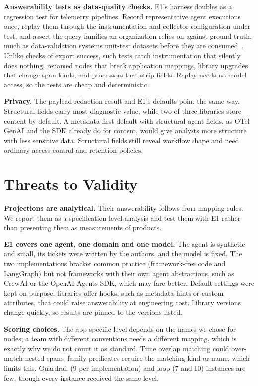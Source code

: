 \documentclass[conference]{IEEEtran}
\begin{document}
\textbf{Answerability tests as data-quality checks.} E1's harness doubles
as a regression test for telemetry pipelines. Record representative
agent executions once, replay them through the instrumentation and
collector configuration under test, and assert the query families an
organization relies on against ground truth, much as data-validation
systems unit-test datasets before they are consumed~\cite{deequ}. Unlike
checks of export success, such tests catch instrumentation that silently
does nothing, renamed nodes that break application mappings, library
upgrades that change span kinds, and processors that strip fields.
Replay needs no model access, so the tests are cheap and deterministic.

\textbf{Privacy.} The payload-redaction result and E1's defaults point
the same way. Structural fields carry most diagnostic value, while two
of three libraries store content by default. A metadata-first default
with structural agent fields, as OTel GenAI and the SDK already do for
content, would give analysts more structure with less sensitive data.
Structural fields still reveal workflow shape and need ordinary access
control and retention policies.

\section{Threats to Validity}
\label{sec:threats}

\textbf{Projections are analytical.} Their answerability follows from
mapping rules. We report them as a specification-level analysis and
test them with E1 rather than presenting them as measurements of
products.

\textbf{E1 covers one agent, one domain and one model.} The agent is
synthetic and small, its tickets were written by the authors, and the
model is fixed. The two implementations bracket common practice
(framework-free code and LangGraph) but not frameworks with their own
agent abstractions, such as CrewAI or the OpenAI Agents SDK, which may
fare better. Default settings were kept on purpose; libraries offer
hooks, such as metadata hints or custom attributes, that could raise
answerability at engineering cost. Library versions change quickly, so
results are pinned to the versions listed.

\textbf{Scoring choices.} The app-specific level depends on the names
we chose for nodes; a team with different conventions needs a different
mapping, which is exactly why we do not count it as standard. Time
overlap matching could over-match nested spans; family predicates
require the matching kind or name, which limits this. Guardrail (9 per
implementation) and loop (7 and 10) instances are few, though every
instance received the same level.
\end{document}
